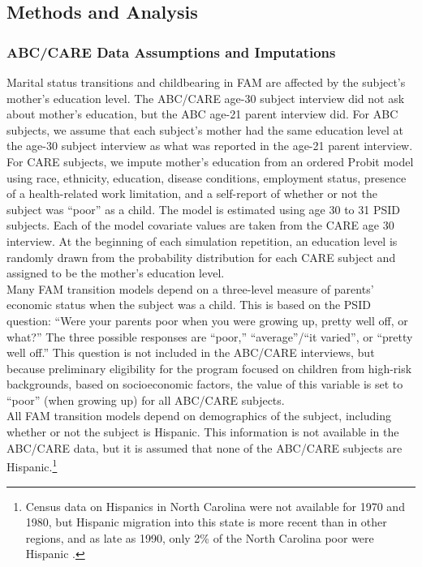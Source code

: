 \subsection{Methods and Analysis}

\subsubsection{ABC/CARE Data Assumptions and Imputations}
\label{section:FAM_ABC_impute}


\noindent Marital status transitions and childbearing in FAM are affected by the subject's mother's education level. The ABC/CARE age-30 subject interview did not ask about mother's education, but the ABC age-21 parent interview did.
For ABC subjects, we assume that each subject's mother had the same education level at the age-30 subject interview as what was reported in the age-21 parent interview. For CARE subjects, we impute mother's education from an ordered Probit model using race, ethnicity, education, disease conditions, employment status, presence of a health-related work limitation, and a self-report of whether or not the subject was ``poor'' as a child.  The model is estimated using age 30 to 31 PSID subjects. Each of the model covariate values are taken from the CARE age 30 interview. At the beginning of each simulation repetition, an education level is randomly drawn from the probability distribution for each CARE subject and assigned to be the mother's education level.  \\

\noindent Many FAM transition models depend on a three-level measure of parents' economic status when the subject was a child.
This is based on the PSID question: ``Were your parents poor when you were growing up, pretty well off, or what?''
The three possible responses are ``poor,'' ``average''/``it varied'', or ``pretty well off.''
This question is not included in the ABC/CARE interviews, but because preliminary eligibility for the program focused on children from high-risk backgrounds, based on socioeconomic factors, the value of this variable is set to ``poor'' (when growing up) for all ABC/CARE subjects. \\

\noindent All FAM transition models depend on demographics of the subject, including whether or not the subject is Hispanic.
This information is not available in the ABC/CARE data, but it is assumed that none of the ABC/CARE subjects are Hispanic.\footnote{Census data on Hispanics in North Carolina were not available for 1970 and 1980, but Hispanic migration into this state is more recent than in other regions, and as late as 1990, only 2\% of the North Carolina poor were Hispanic \citep{Johnson_2003_Changing-Poverty}.} \\

